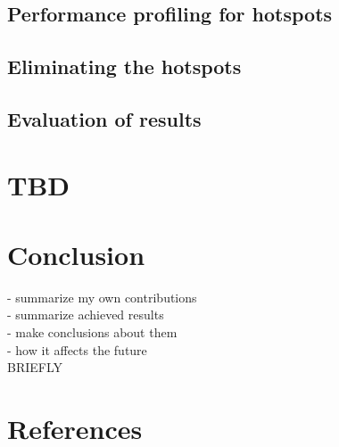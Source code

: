 \documentclass[12pt]{article}
\begin{document}
	\subsection{Performance profiling for hotspots}
	
	\subsection{Eliminating the hotspots}
	
	\subsection{Evaluation of results}
		
	
	\section{TBD}
	
	\section{Conclusion}
	
	\color{red}
	- summarize my own contributions \\
	- summarize achieved results \\
	- make conclusions about them \\
	- how it affects the future \\
	BRIEFLY
	\color{black}

	
	\section{References}
	
\end{document}
